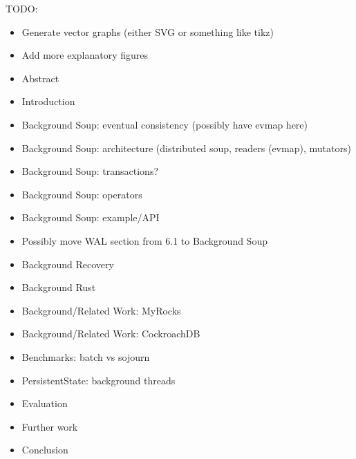 \color{purple}
TODO:
\begin{itemize}
  \item Generate vector graphs (either SVG or something like tikz)
  \item Add more explanatory figures

  \item Abstract
  \item Introduction

  \item Background Soup: eventual consistency (possibly have evmap here)
  \item Background Soup: architecture (distributed soup, readers (evmap), mutators)
  \item Background Soup: transactions?
  \item Background Soup: operators
  \item Background Soup: example/API
  \item Possibly move WAL section from 6.1 to Background Soup

  \item Background Recovery
  \item Background Rust

  \item Background/Related Work: MyRocks
  \item Background/Related Work: CockroachDB

  \item Benchmarks: batch vs sojourn

  \item PersistentState: background threads

  \item Evaluation
  \item Further work
  \item Conclusion
\end{itemize}

